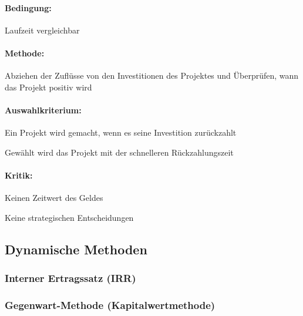 \paragraph{Bedingung:} Laufzeit vergleichbar
\paragraph{Methode:} Abziehen der Zuflüsse von den Investitionen des Projektes und Überprüfen, wann das Projekt positiv wird

\paragraph{Auswahlkriterium:}
\begin{compactitem}
	\item Ein Projekt wird gemacht, wenn es seine Investition zurückzahlt
	\item Gewählt wird das Projekt mit der schnelleren Rückzahlungszeit
\end{compactitem}

\paragraph{Kritik:}
\begin{compactitem}
	\item Keinen Zeitwert des Geldes
	\item Keine strategischen Entscheidungen
\end{compactitem}



\clearpage
\subsection{Dynamische Methoden}
\clearpage
\subsubsection{Interner Ertragssatz (IRR)}

\clearpage
\subsubsection{Gegenwart-Methode (Kapitalwertmethode)}

